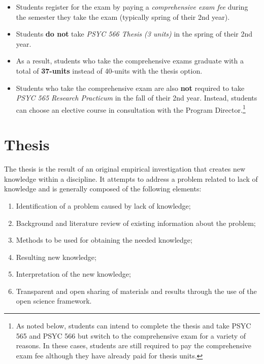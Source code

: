\documentclass[openany]{book}
\providecommand{\tightlist}{%
  \setlength{\itemsep}{0pt}\setlength{\parskip}{0pt}}
\begin{document}
\begin{itemize}
\tightlist
\item
  Students register for the exam by paying a \emph{comprehensive exam fee} during the semester they take the exam (typically spring of their 2nd year).
\item
  Students \textbf{do not} take \emph{PSYC 566 Thesis (3 units)} in the spring of their 2nd year.\\
\item
  As a result, students who take the comprehensive exams graduate with a total of \textbf{37-units}
  instead of 40-units with the thesis option.
\item
  Students who take the comprehensive exam are also \textbf{not} required to take \emph{PSYC 565 Research Practicum} in the fall of their 2nd year. Instead, students can choose an elective course in consultation with the Program Director.\footnote{As noted below, students can intend to complete the thesis and take PSYC 565 and PSYC 566 but switch to the comprehensive exam for a variety of reasons. In these cases, students are still required to pay the comprehensive exam fee although they have already paid for thesis units.}
\end{itemize}

\hypertarget{thesis}{%
\section{Thesis}\label{thesis}}

The thesis is the result of an original empirical investigation that creates new knowledge within a discipline. It attempts to address a problem related to lack of knowledge and is generally composed of the following elements:

\begin{enumerate}
\def\labelenumi{\arabic{enumi}.}
\tightlist
\item
  Identification of a problem caused by lack of knowledge;
\item
  Background and literature review of existing information about the problem;
\item
  Methods to be used for obtaining the needed knowledge;
\item
  Resulting new knowledge;
\item
  Interpretation of the new knowledge;
\item
  Transparent and open sharing of materials and results through the use of the open science framework.
\end{enumerate}
\end{document}
